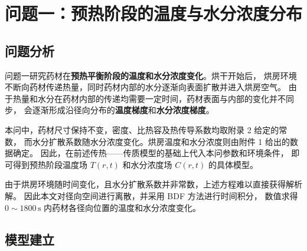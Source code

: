 



\section{问题一：预热阶段的温度与水分浓度分布}

\subsection{问题分析}

问题一研究药材在\textbf{预热平衡阶段的温度和水分浓度变化}。烘干开始后，
烘房环境不断向药材传递热量，同时药材内部的水分逐渐向表面扩散并进入烘房空气。
由于热量和水分在药材内部的传递均需要一定时间，药材表面与内部的变化并不同步，
会逐渐形成沿径向分布的\textbf{温度梯度}和\textbf{水分浓度梯度}。

本问中，药材尺寸保持不变，密度、比热容及热传导系数均取附录 2 给定的常数，
而水分扩散系数随水分浓度变化。烘房温度和水分浓度则由附件 1 给出的数据确定。
因此，在前述传热——传质模型的基础上代入本问参数和环境条件，
即可得到预热阶段温度场 $T(r,t)$ 和水分浓度场 $C(r,t)$ 的具体模型。

由于烘房环境随时间变化，且水分扩散系数并非常数，上述方程难以直接获得解析解。
因此本文对径向空间进行离散，并采用 BDF 方法进行时间积分，
数值求得 $0\sim1800\,\mathrm{s}$ 内药材各径向位置的温度和水分浓度变化。

\subsection{模型建立}



